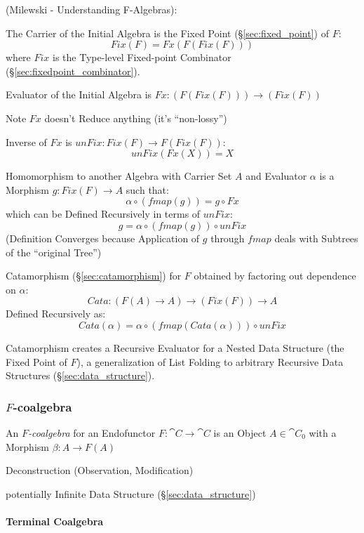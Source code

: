 (Milewski - Understanding F-Algebras):

The Carrier of the Initial Algebra is the Fixed Point
(\S\ref{sec:fixed_point}) of $F$:
\[
  Fix (F) = Fx (F (Fix (F)))
\]
where $Fix$ is the Type-level Fixed-point Combinator
(\S\ref{sec:fixedpoint_combinator}).

Evaluator of the Initial Algebra is $Fx : (F (Fix (F))) \rightarrow
(Fix (F))$

\fist Note $Fx$ doesn't Reduce anything (it's ``non-lossy'')

Inverse of $Fx$ is $unFix : Fix (F) \rightarrow F (Fix (F))$:
\[
  unFix (Fx (X)) = X
\]

Homomorphism to another Algebra with Carrier Set $A$ and Evaluator
$\alpha$ is a Morphism $g : Fix (F) \rightarrow A$ such that:
\[
  \alpha \circ (fmap (g)) = g \circ Fx
\]
which can be Defined Recursively in terms of $unFix$:
\[
  g = \alpha \circ (fmap (g)) \circ unFix
\]
(Definition Converges because Application of $g$ through $fmap$ deals
with Subtrees of the ``original Tree'')

Catamorphism (\S\ref{sec:catamorphism}) for $F$ obtained by factoring
out dependence on $\alpha$:
\[
  Cata : (F (A) \rightarrow A) \rightarrow (Fix (F)) \rightarrow A
\]
Defined Recursively as:
\[
  Cata (\alpha) = \alpha \circ (fmap (Cata (\alpha))) \circ unFix
\]

Catamorphism creates a Recursive Evaluator for a Nested Data Structure
(the Fixed Point of $F$), a generalization of List Folding to
arbitrary Recursive Data Structures (\S\ref{sec:data_structure}).



\subsubsection{$F$-coalgebra}\label{sec:f_coalgebra}

An \emph{$F$-coalgebra} for an Endofunctor $F : \cat{C} \rightarrow
\cat{C}$ is an Object $A \in \cat{C}_0$ with a Morphism $\beta : A
\rightarrow F(A)$ \cite{corfield08}

Deconstruction (Observation, Modification)

potentially Infinite Data Structure (\S\ref{sec:data_structure})



\paragraph{Terminal Coalgebra}\label{sec:terminal_coalgebra}
\hfill \\

